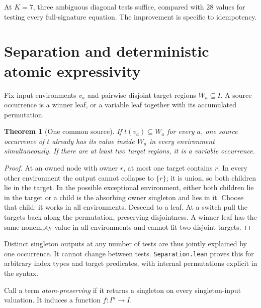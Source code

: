 \documentclass[11pt]{article}
\newtheorem{theorem}{Theorem}[section]
\begin{document}
At $K=7$, three ambiguous diagonal tests suffice, compared with $28$
values for testing every full-signature equation. The improvement is
specific to idempotency.

\section{Separation and deterministic atomic expressivity}\label{sec:sep}

Fix input environments $v_a$ and pairwise disjoint target regions
$W_a\subseteq I$. A source occurrence is a winner leaf, or a variable
leaf together with its accumulated permutation.

\begin{theorem}[One common source]\label{thm:source}
If $t(v_a)\subseteq W_a$ for every $a$, one source occurrence of $t$
already has its value inside $W_a$ in every environment simultaneously.
If there are at least two target regions, it is a variable occurrence.
\end{theorem}
\begin{proof}
At an owned node with owner $r$, at most one target contains $r$.
In every other environment the output cannot collapse to $\{r\}$;
it is union, so both children lie in the target. In the possible
exceptional environment, either both children lie in the target or a
child is the absorbing owner singleton and lies in it. Choose that child:
it works in all environments. Descend to a leaf. At a switch pull the
targets back along the permutation, preserving disjointness. A winner
leaf has the same nonempty value in all environments and cannot fit
two disjoint targets.
\end{proof}

Distinct singleton outputs at any number of tests are thus jointly
explained by one occurrence. It cannot change between tests.
\texttt{Separation.lean} proves this for arbitrary index types and target
predicates, with internal permutations explicit in the syntax.

Call a term \emph{atom-preserving} if it returns a singleton on every
singleton-input valuation. It induces a function $f:I^n\to I$.
\end{document}
